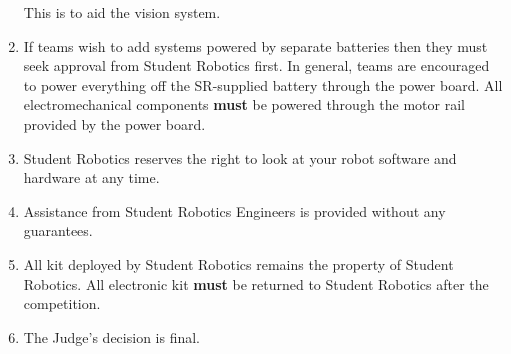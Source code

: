 \begin{enumerate}
 This is to aid the vision system.
\item If teams wish to add systems powered by separate batteries then they must seek approval from Student Robotics first.
 In general, teams are encouraged to power everything off the SR-supplied battery through the power board.
 All electromechanical components \textbf{must} be powered through the motor rail provided by the power board.
\item Student Robotics reserves the right to look at your robot software and hardware at any time.
\item Assistance from Student Robotics Engineers is provided without any guarantees.
\item All kit deployed by Student Robotics remains the property of Student Robotics.
 All electronic kit \textbf{must} be returned to Student Robotics after the competition.
\item The Judge's decision is final.


\end{enumerate}
